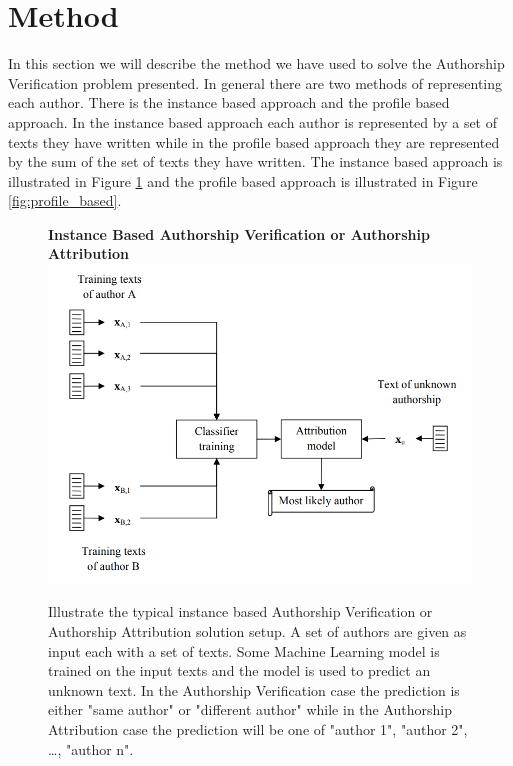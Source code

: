 \section{Method} \label{sec:method} 

In this section we will describe the method we have used to solve the Authorship
Verification problem presented. In general there are two methods of representing
each author. There is the instance based approach and the profile based
approach. In the instance based approach each author is represented by a set of
texts they have written while in the profile based approach they are represented
by the sum of the set of texts they have written. The instance based approach is
illustrated in Figure \ref{fig:instance_based} and the profile based approach is
illustrated in Figure \ref{fig:profile_based}.

\begin{figure}[htb]
    \centering
    \textbf{Instance Based Authorship Verification or Authorship Attribution}
    \includegraphics[scale=0.4]{./pictures/method/instance_based.png}

    \caption{Illustrate the typical instance based Authorship Verification or
        Authorship Attribution solution setup.\cite{stamatos2009} A set of
        authors are given as input each with a set of texts. Some Machine
        Learning model is trained on the input texts and the model is used to
        predict an unknown text. In the Authorship Verification case the
        prediction is either "same author" or "different author" while in the
        Authorship Attribution case the prediction will be one of "author 1",
        "author 2", \dots, "author n".}
    \label{fig:instance_based}
\end{figure}


